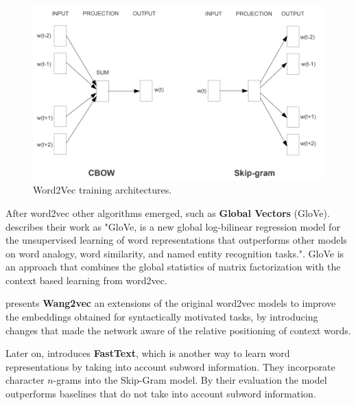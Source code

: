 \begin{figure}[h]
	\caption{Word2Vec training architectures.}
	\label{fig:word2vec}
	\centering%
	\begin{minipage}{.9\textwidth}
		\includegraphics[width=\textwidth]{word2vec.png}
	\end{minipage}
\end{figure}

After word2vec other algorithms emerged, such as \textbf{Global Vectors} (GloVe).  describes their work as "GloVe, is a new global log-bilinear regression model for the unsupervised learning of word representations that outperforms other models on word analogy, word similarity, and named entity recognition tasks.". GloVe is an approach that combines the global statistics of matrix factorization with the context based learning from word2vec.

 presents \textbf{Wang2vec} an extensions of the original word2vec models to improve the embeddings obtained for syntactically motivated tasks, by introducing changes that made the network aware of the relative positioning of context words.

Later on,  introduces \textbf{FastText}, which is another way to learn word representations by taking into account subword information. They incorporate character $n$-grams into the Skip-Gram model. By their evaluation the model outperforms baselines that do not take into account subword information.



